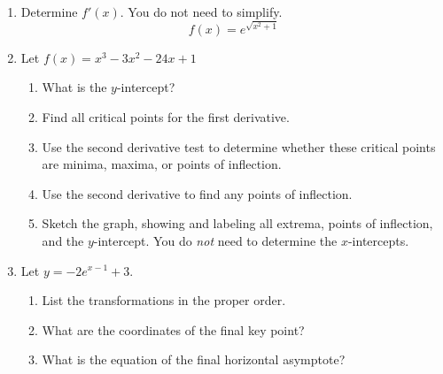 \documentclass[letterpaper,12pt,fleqn]{article}
\begin{document}
\begin{enumerate}[left=0pt]

\item Determine \(f'(x)\).  You do not need to simplify.
  \[f(x)=e^{\sqrt{x^2+1}}\]

  \newpage

\item Let \(f(x)=x^3-3x^2-24x+1\)
  \begin{enumerate}
  \item What is the \(y\)-intercept?

    \vspace{2in}
    
  \item Find all critical points for the first derivative.

    \vspace{3in}
    
  \item Use the second derivative test to determine whether these critical points are minima, maxima, or points of
    inflection.

    \newpage
    
  \item Use the second derivative to find any points of inflection.

    \vspace{3in}
    
  \item Sketch the graph, showing and labeling all extrema, points of inflection, and the \(y\)-intercept.  You do \emph{not}
    need to determine the \(x\)-intercepts.
  \end{enumerate}

  \newpage

\item Let \(y=-2e^{x-1}+3\).
  \begin{enumerate}
  \item List the transformations in the proper order.

    \vspace{3in}
    
  \item What are the coordinates of the final key point?

    \vspace{2in}
    
  \item What is the equation of the final horizontal asymptote?

    \newpage
    

\end{enumerate}
\end{enumerate}
\end{document}
